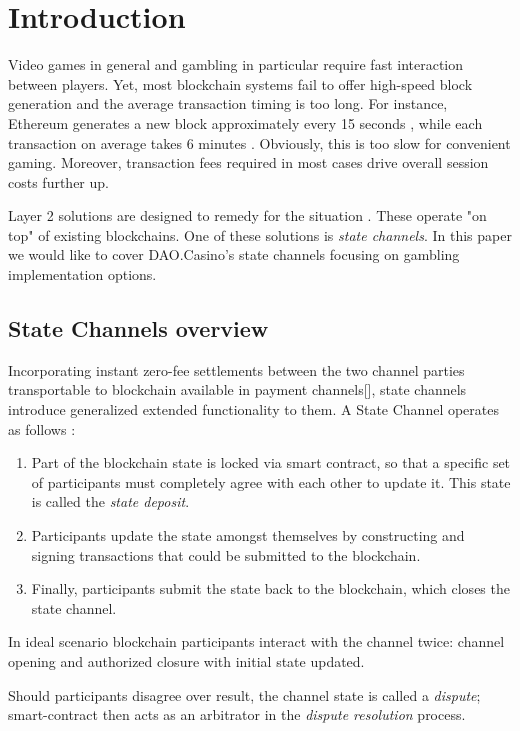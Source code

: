 \section{Introduction}
	Video games in general and gambling in particular require fast interaction between players. Yet, most blockchain systems fail to offer high-speed block generation and the average transaction timing is too long. For instance, Ethereum generates a new block approximately every 15 seconds \cite{bib2}, while each transaction on average takes 6 minutes \cite{bib3}. Obviously, this is too slow for convenient gaming. Moreover, transaction fees required in most cases drive overall session costs further up.


	Layer 2 solutions are designed to remedy for the situation \cite{bib4}. These operate "on top" of existing blockchains. One of these solutions is \textit{state channels}. In this paper we would like to cover DAO.Casino's state channels focusing on gambling implementation options.


		\subsection {State Channels overview}
	Incorporating instant zero-fee settlements between the two channel parties transportable to blockchain available in payment channels[], state channels introduce generalized extended functionality to them. 
	A State Channel operates as follows \cite{bib5}:
	\begin{enumerate}
		\item Part of the blockchain state is locked via smart contract, so that a specific set of participants must completely agree with each other to update it. This state is called the \textit {state deposit}.
		\item Participants update the state amongst themselves by constructing and signing transactions that could be submitted to the blockchain.
		\item Finally, participants submit the state back to the blockchain, which closes the state channel.
	\end{enumerate}

	In ideal scenario blockchain participants interact with the channel twice: channel opening and authorized closure with initial state updated.

	Should participants disagree over result, the channel state is called a \textit {dispute}; smart-contract then acts as an arbitrator in the \textit {dispute resolution} process.

